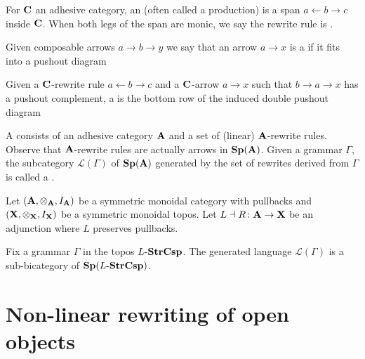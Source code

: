 \documentclass{amsart}
\begin{document}
\begin{df} \label{df_rewrite-rule}
	For $ \mathbf{C} $ an adhesive category, an  (often called a production) is a span $ a \gets b \to c $ inside $ \mathbf{C} $.  When both legs of the span are monic, we say the rewrite rule is .
\end{df}	
	
\begin{df} \label{df_pushout-complement}
	Given composable arrows $ a \to b \to y $ we say that an arrow $ a \to x $ is a  if it fits into a pushout diagram
\end{df}

\begin{df} \label{df_derived-rewrite-rule}
	Given a $ \mathbf{C} $-rewrite rule $ a \gets b \to c $ and a $ \mathbf{C} $-arrow $a \to x$ such that $ b \to a \to x $ has a pushout complement, a  is the bottom row of the induced double pushout diagram
\end{df}

\begin{df} \label{df_grammar-and-language}
	A  consists of an adhesive category $ \mathbf{A} $ and a set of (linear) $ \mathbf{A} $-rewrite rules.  Observe that $ \mathbf{A} $-rewrite rules are actually arrows in $ \mathbf{Sp}(\mathbf{A}) $.  Given a grammar $ \Gamma $, the subcategory $ \mathcal{L} ( \Gamma ) $ of $ \mathbf{Sp}( \mathbf{A} ) $ generated by the set of rewrites derived from $ \Gamma $ is called a .  
\end{df}

\begin{lem} \label{thm_open-objects-language}
	Let $ (\mathbf{A} , \otimes_{\mathbf{A}} , I_{\mathbf{A}}) $ be a symmetric monoidal category with pullbacks and $ (\mathbf{X} , \otimes_{\mathbf{X}} , I_{\mathbf{X}}) $ be a symmetric monoidal topos.  Let $ L \dashv R \colon \mathbf{A} \to \mathbf{X} $ be an adjunction where $ L $ preserves pullbacks.
	
	Fix a grammar $ \Gamma $ in the topos $ L \text{-} \mathbf{StrCsp} $.  The generated  language $ \mathcal{L}(\Gamma) $ is a sub-bicategory of $ \mathbf{Sp}(L \text{-} \mathbf{StrCsp}) $. 
\end{lem}

\section{Non-linear rewriting of open objects}
\end{document}
